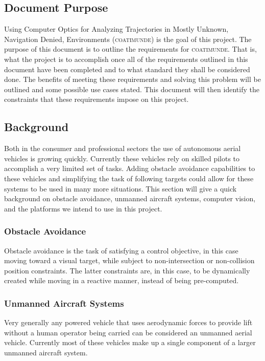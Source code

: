 \documentclass{article}
\begin{document}
	\subsection{Document Purpose}
	
	Using Computer Optics for Analyzing Trajectories in Mostly Unknown, Navigation Denied, Environments (\textsc{coatimunde}) is the goal of this project. The purpose of this document is to outline the requirements for \textsc{coatimunde}. That is, what the project is to accomplish once all of the requirements outlined in this document have been completed and to what standard they shall be considered done. The benefits of meeting these requirements and solving this problem will be outlined and some possible use cases stated. This document will then identify the constraints that these requirements impose on this project.
	
	\subsection{Background}
	
	Both in the consumer and professional sectors the use of autonomous aerial vehicles is growing quickly. Currently these vehicles rely on skilled pilots to accomplish a very limited set of tasks. Adding obstacle avoidance capabilities to these vehicles and simplifying the task of following targets could allow for these systems to be used in many more situations. This section will give a quick background on obstacle avoidance, unmanned aircraft systems, computer vision, and the platforms we intend to use in this project.
	
		\subsubsection{Obstacle Avoidance}
		
		
		Obstacle avoidance is the task of satisfying a control objective, in this case moving toward a visual target, while subject to non-intersection or non-collision position constraints. The latter constraints are, in this case, to be dynamically created while moving in a reactive manner, instead of being pre-computed.
		
		\subsubsection{Unmanned Aircraft Systems}
		
		Very generally any powered vehicle that uses aerodynamic forces to provide lift without a human operator being carried can be considered an unmanned aerial vehicle. Currently most of these vehicles make up a single component of a larger unmanned aircraft system. 
		
\end{document}
